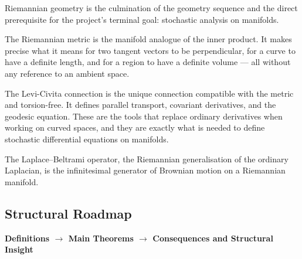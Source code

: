

\begin{tcolorbox}[
  colback=gray!6,
  colframe=gray!40,
  arc=2pt,
  left=8pt, right=8pt, top=6pt, bottom=6pt,
  title={\small\textbf{Structural Role: Riemannian Geometry — Intrinsic Metric Structure}},
  fonttitle=\small\bfseries
]
Riemannian geometry is the culmination of the geometry sequence
and the direct prerequisite for the project's terminal goal:
stochastic analysis on manifolds.

The Riemannian metric is the manifold analogue of the inner product.
It makes precise what it means for two tangent vectors to be
perpendicular, for a curve to have a definite length, and for
a region to have a definite volume --- all without any reference
to an ambient space.

The Levi-Civita connection is the unique connection compatible
with the metric and torsion-free.
It defines parallel transport, covariant derivatives, and
the geodesic equation.
These are the tools that replace ordinary derivatives when
working on curved spaces, and they are exactly what is needed
to define stochastic differential equations on manifolds.

The Laplace--Beltrami operator, the Riemannian generalisation
of the ordinary Laplacian, is the infinitesimal generator of
Brownian motion on a Riemannian manifold.
\end{tcolorbox}
\vspace{1em}

\subsection*{Structural Roadmap}

\begin{center}
\textbf{Definitions $\longrightarrow$ Main Theorems
$\longrightarrow$ Consequences and Structural Insight}
\end{center}

